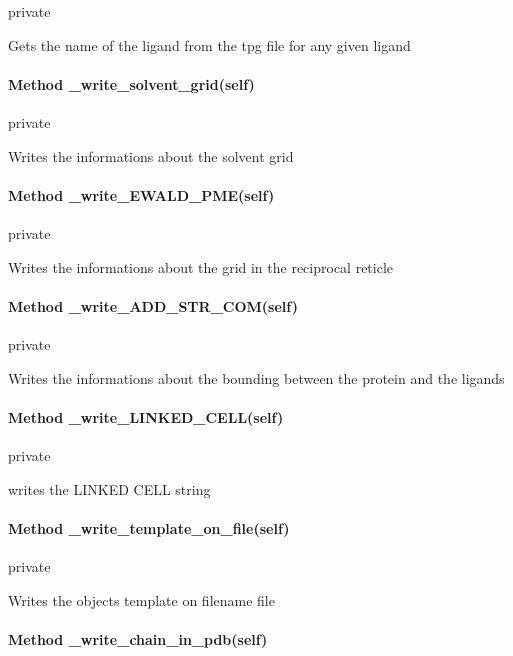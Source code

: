             private
            
            Gets the name of the ligand from the tpg file
            for any given ligand


        \paragraph{Method \_write\_solvent\_grid(self)}
        
            private
            
            Writes the informations about the solvent grid    
            
        
        \paragraph{Method \_write\_EWALD\_PME(self)}
            
            private
            
            Writes the informations about the grid
            in the reciprocal reticle


        \paragraph{Method \_write\_ADD\_STR\_COM(self)}
            
            private
            
            Writes the informations about the bounding between the protein and the ligands


        \paragraph{Method \_write\_LINKED\_CELL(self)}
            
            private
            
            writes the LINKED CELL string


        \paragraph{Method \_write\_template\_on\_file(self)}
        
            private

            Writes the objects template on {filename} file


        \paragraph{Method \_write\_chain\_in\_pdb(self)}
            
